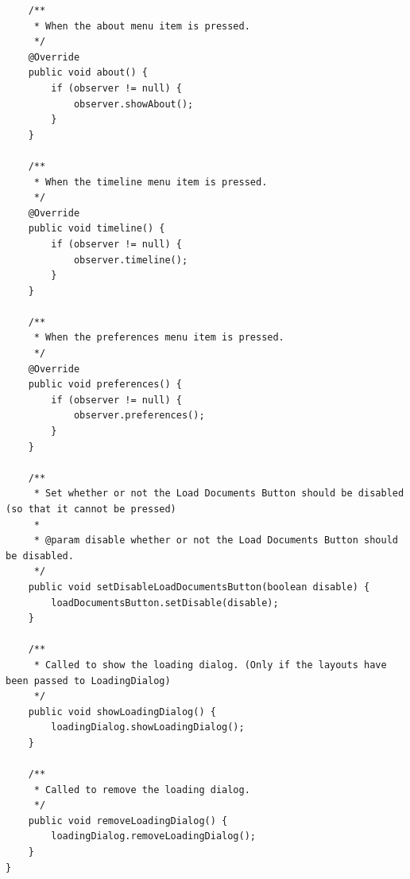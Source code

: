 \begin{lstlisting}
    /**
     * When the about menu item is pressed.
     */
    @Override
    public void about() {
        if (observer != null) {
            observer.showAbout();
        }
    }

    /**
     * When the timeline menu item is pressed.
     */
    @Override
    public void timeline() {
        if (observer != null) {
            observer.timeline();
        }
    }

    /**
     * When the preferences menu item is pressed.
     */
    @Override
    public void preferences() {
        if (observer != null) {
            observer.preferences();
        }
    }

    /**
     * Set whether or not the Load Documents Button should be disabled (so that it cannot be pressed)
     *
     * @param disable whether or not the Load Documents Button should be disabled.
     */
    public void setDisableLoadDocumentsButton(boolean disable) {
        loadDocumentsButton.setDisable(disable);
    }

    /**
     * Called to show the loading dialog. (Only if the layouts have been passed to LoadingDialog)
     */
    public void showLoadingDialog() {
        loadingDialog.showLoadingDialog();
    }

    /**
     * Called to remove the loading dialog.
     */
    public void removeLoadingDialog() {
        loadingDialog.removeLoadingDialog();
    }
}
\end{lstlisting}
